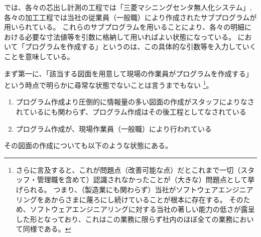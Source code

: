 

\MMname では、各々の芯出し計測の工程では「三菱マシニングセンタ無人化システム」, 各々の加工工程では当社の従業員（一般職）により作成されたサブプログラムが用いられている。
これらのサブプログラムを用いることにより、各々の明細における必要な寸法値等を引数に格納して用いればよい状態になっている。
\MMname において「プログラムを作成する」というのは、この具体的な引数等を入力していくことを意味している。



まず第一に、「該当する図面を用意して現場の作業員がプログラムを作成する」という時点で明らかに尋常な状態でないことは言うまでもない
\footnote{さらに言及すると、これが問題点（改善可能な点）だとこれまで一切（スタッフ・管理職を含めて）認識されなかったことが（大きな）問題点として挙げられる。
つまり、（製造業にも関わらず）当社がソフトウェアエンジニアリングをあからさまに蔑ろにし続けていることが根本に存在する。
そのため、ソフトウェアエンジニアリングに対する当社の著しい能力の低さが露呈した形となっており、これはこの業務に限らず社内のほぼ全ての業務において同様である。}。
\begin{Tabbox}[title={プログラムの作成}]
\begin{enumerate}
\item プログラム作成より圧倒的に情報量の多い図面の作成がスタッフによりなされているにも関わらず、プログラム作成はその後工程としてなされている
\item プログラム作成が、現場作業員（一般職）により行われている
\end{enumerate}
\end{Tabbox}
その図面の作成についても以下のような状態にある。
